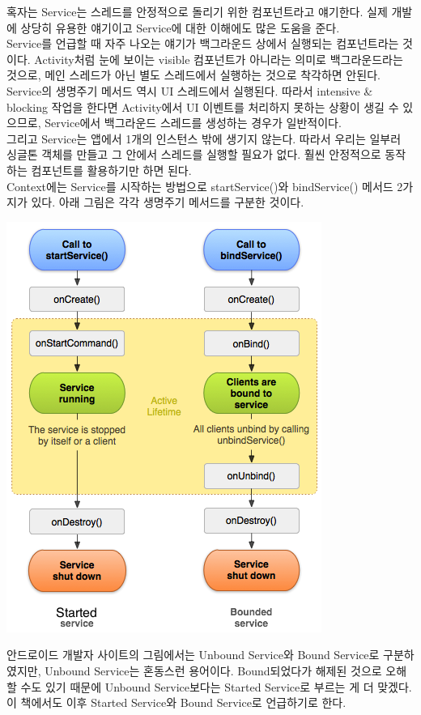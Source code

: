 혹자는 Service는 스레드를 안정적으로 돌리기 위한 컴포넌트라고 얘기한다. 
실제 개발에 상당히 유용한 얘기이고 Service에 대한 이해에도 많은 도움을 준다.\\

Service를 언급할 때 자주 나오는 얘기가 백그라운드 상에서 실행되는 컴포넌트라는 것이다. 
Activity처럼 눈에 보이는 visible 컴포넌트가 아니라는 의미로 백그라운드라는 것으로, 메인 스레드가 아닌 별도 스레드에서 실행하는 것으로 착각하면 안된다.
Service의 생명주기 메서드 역시 UI 스레드에서 실행된다. 
따라서 intensive \& blocking 작업을 한다면 Activity에서 UI 이벤트를 처리하지 못하는 상황이 생길 수 있으므로, Service에서 백그라운드 스레드를 생성하는 경우가 일반적이다.\\

그리고 Service는 앱에서 1개의 인스턴스 밖에 생기지 않는다. 따라서 우리는 일부러 싱글톤 객체를 만들고 그 안에서 스레드를 실행할 필요가 없다. 훨씬 안정적으로 동작하는 컴포넌트를 활용하기만 하면 된다.\\

Context에는 Service를 시작하는 방법으로 startService()와 bindService() 메서드 2가지가 있다. 아래 그림은 각각 생명주기 메서드를 구분한 것이다. 

\includegraphics[scale=0.7]{service-lifecycle}

안드로이드 개발자 사이트의 그림에서는 Unbound Service와 Bound Service로 구분하였지만, Unbound Service는 혼동스런 용어이다. 
Bound되었다가 해제된 것으로 오해할 수도 있기 때문에 Unbound Service보다는 Started Service로 부르는 게 더 맞겠다. 
이 책에서도 이후 Started Service와 Bound Service로 언급하기로 한다.\\

